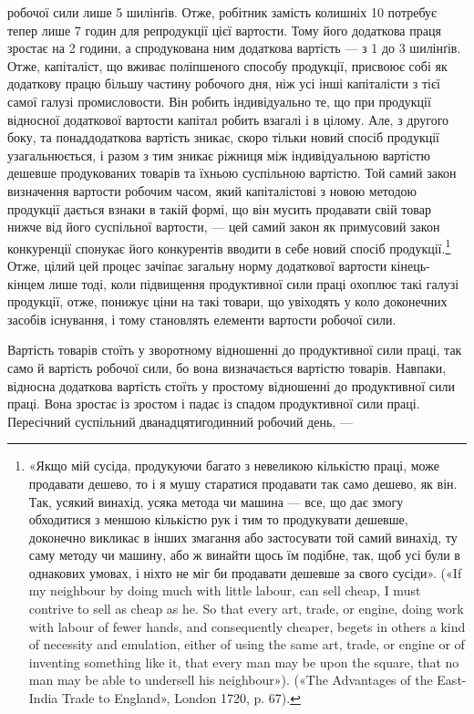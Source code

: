 робочої сили лише 5 шилінґів. Отже, робітник замість колишніх
10 потребує тепер лише 7 годин для репродукції цієї вартости.
Тому його додаткова праця зростає на 2 години, а спродукована
ним додаткова вартість — з 1 до 3 шилінґів. Отже, капіталіст,
що вживає поліпшеного способу продукції, присвоює собі як додаткову працю більшу
частину робочого дня, ніж усі інші капіталісти
з тієї самої галузі промисловости. Він робить індивідуально те,
що при продукції відносної додаткової вартости капітал робить
взагалі і в цілому. Але, з другого боку, та понаддодаткова вартість
зникає, скоро тільки новий спосіб продукції узагальнюється, і
разом з тим зникає ріжниця між індивідуальною вартістю дешевше
продукованих товарів та їхньою суспільною вартістю. Той самий
закон визначення вартости робочим часом, який капіталістові
з новою методою продукції дається взнаки в такій формі, що він
мусить продавати свій товар нижче від його суспільної вартости, — цей самий
закон як примусовий закон конкуренції спонукає його конкурентів вводити в себе
новий спосіб продукції.\footnote{
«Якщо мій сусіда, продукуючи багато з невеликою кількістю праці,
може продавати дешево, то і я мушу старатися продавати так само дешево,
як він. Так, усякий винахід, усяка метода чи машина — все, що дає змогу
обходитися з меншою кількістю рук і тим то продукувати дешевше, доконечно
викликає в інших змагання або застосувати той самий винахід,
ту саму методу чи машину, або ж винайти щось їм подібне, так, щоб
усі були в однакових умовах, і ніхто не міг би продавати дешевше за свого
сусіди». («If my neighbour by doing much with little labour, can sell
cheap, I must contrive to sell as cheap as he. So that every art, trade, or
engine, doing work with labour of fewer hands, and consequently cheaper,
begets in others a kind of necessity and emulation, either of using the same
art, trade, or engine or of inventing something like it, that every man
may be upon the square, that no man may be able to undersell his neighbour»).
(«The Advantages of the East-India Trade to England», London 1720, p. 67).
} Отже, цілий цей процес зачіпає загальну норму додаткової вартости
кінець-кінцем лише тоді, коли підвищення продуктивної
сили праці охоплює такі галузі продукції, отже, понижує ціни
на такі товари, що увіходять у коло доконечних засобів існування,
і тому становлять елементи вартости робочої сили.

Вартість товарів стоїть у зворотному відношенні до продуктивної сили праці,
так само й вартість робочої сили, бо вона
визначається вартістю товарів. Навпаки, відносна додаткова
вартість стоїть у простому відношенні до продуктивної сили праці.
Вона зростає із зростом і падає із спадом продуктивної сили праці.
Пересічний суспільний дванадцятигодинний робочий день, —
\parbreak{}  %
